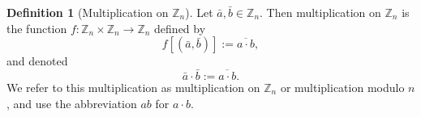 \documentclass[12pt, titlepage]{amsart}
\newcommand\Z{{\mathbb Z}}
\newtheorem{lemma}{Lemma}[subsection]
\theoremstyle{definition}
\newtheorem{definition}{Definition}[subsection]
\begin{document}
	\begin{definition}[Multiplication on $\Z_n$]\label{definition:multiplication on Zn}
		Let $\bar{a}, \bar{b} \in \Z_n$.
		Then multiplication on $\Z_n$ is the function $f: \Z_n \times \Z_n \to \Z_n$ defined by $$f[(\bar{a}, \bar{b})] := \overline{a \cdot b},$$
		and denoted $$ \bar{a} \cdot \bar{b} := \overline{a \cdot b}.$$
		We refer to this multiplication as multiplication on $\Z_n$ or multiplication modulo $n$, and use the abbreviation $ab$ for $a \cdot b$.
	\end{definition}
	
%	
%	
%		
%		
%		
%	
	
\end{document}
